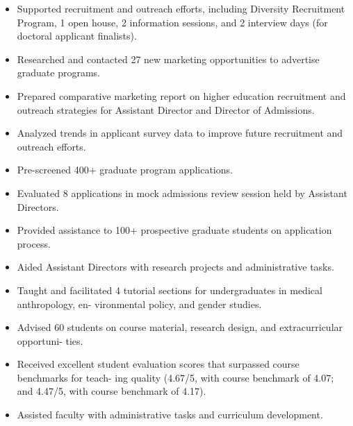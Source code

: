 \documentclass[a4paper, 12pt]{classycv}
\begin{document}
\begin{resume}
    \begin{itemize}
        \item Supported recruitment and outreach efforts, including Diversity Recruitment Program, 1 open house, 2 information sessions, and 2 interview days (for doctoral applicant finalists).
        \item Researched and contacted 27 new marketing opportunities to advertise graduate programs.
        \item Prepared comparative marketing report on higher education recruitment and outreach strategies for Assistant Director and Director of Admissions.
        \item Analyzed trends in applicant survey data to improve future recruitment and outreach efforts.
        \item Pre-screened 400+ graduate program applications.
        \item Evaluated 8 applications in mock admissions review session held by Assistant Directors.
        \item Provided assistance to 100+ prospective graduate students on application process.
        \item Aided Assistant Directors with research projects and administrative tasks.
    \end{itemize}


    \begin{itemize}
        \item Taught and facilitated 4 tutorial sections for undergraduates in medical anthropology, en- vironmental policy, and gender studies.
        \item Advised 60 students on course material, research design, and extracurricular opportuni- ties.
        \item Received excellent student evaluation scores that surpassed course benchmarks for teach- ing quality (4.67/5, with course benchmark of 4.07; and 4.47/5, with course benchmark of 4.17).
        \item Assisted faculty with administrative tasks and curriculum development.
    \end{itemize}



\end{resume}
\end{document}
